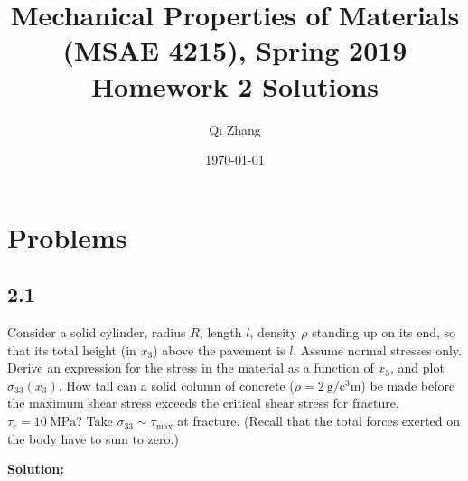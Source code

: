 \documentclass[12pt]{article}
\begin{document}

\title{Mechanical Properties of Materials (MSAE 4215), Spring 2019\\ Homework 2 Solutions}
\author{Qi Zhang}
\date{\today}

\maketitle

\tableofcontents
\listoffigures
\listoftables

\section{Problems}
\subsection{2.1}
Consider a solid cylinder, radius $R$, length $l$, density $\rho$ standing up on its end,
so that its total height (in $x_3$) above the pavement is $l$. Assume normal stresses only.
Derive an expression for the stress in the material as a function of $x_3$, and
plot $\sigma_{33}(x_3)$. How tall can a solid column of concrete ($\rho = \SI{2}{\gram\per\cubic\centi\meter}$)
be made before the maximum shear stress exceeds the critical shear stress for
fracture, $\tau_c = \SI{10}{\mega\pascal}$? Take $\sigma_{33} \sim \tau_\text{max}$ at fracture.
(Recall that the total forces exerted on the body have to sum to zero.)

\textbf{Solution:}
\end{document}
